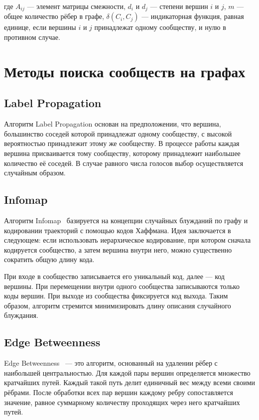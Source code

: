 где $A_{ij}$ — элемент матрицы смежности, $d_i$ и $d_j$ — степени вершин $i$ и $j$, $m$ — общее количество рёбер в графе, $\delta(C_i, C_j)$ — индикаторная функция, равная единице, если вершины $i$ и $j$ принадлежат одному сообществу, и нулю в противном случае.

\section{Методы поиска сообществ на графах}

\subsection{Label Propagation}

Алгоритм Label Propagation основан на предположении, что вершина, большинство соседей которой принадлежат одному сообществу, с высокой вероятностью принадлежит этому же сообществу. В процессе работы каждая вершина присваивается тому сообществу, которому принадлежит наибольшее количество её соседей. В случае равного числа голосов выбор осуществляется случайным образом.

\subsection{Infomap}

Алгоритм Infomap~\cite{alg} базируется на концепции случайных блужданий по графу и кодировании траекторий с помощью кодов Хаффмана. Идея заключается в следующем: если использовать иерархическое кодирование, при котором сначала кодируется сообщество, а затем вершина внутри него, можно существенно сократить общую длину кода.

При входе в сообщество записывается его уникальный код, далее — код вершины. При перемещении внутри одного сообщества записываются только коды вершин. При выходе из сообщества фиксируется код выхода. Таким образом, алгоритм стремится минимизировать длину описания случайного блуждания.

\subsection{Edge Betweenness}

Edge Betweenness~\cite{alg} — это алгоритм, основанный на удалении рёбер с наибольшей центральностью. Для каждой пары вершин определяется множество кратчайших путей. Каждый такой путь делит единичный вес между всеми своими рёбрами. После обработки всех пар вершин каждому ребру сопоставляется значение, равное суммарному количеству проходящих через него кратчайших путей.

